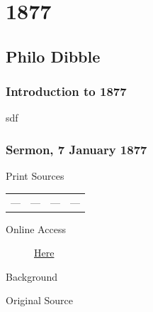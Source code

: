 \section{1877}

	\subsection{Philo Dibble}
		\label{EMS-1877-PD}

		\subsubsection{Introduction to 1877}
		
			sdf
			
		\subsubsection{Sermon, 7 January 1877}
			\label{EMS-1877-PD-7-JAN-1877}
			
			\begin{description}
					\item[Print Sources]
				\end{description}

					\begin{tabular}{p{0.5in}p{1in}p{0.5in}p{1in}}
					---	& ---		& --- 		& --- \\
					\end{tabular}
				
				\begin{description}
					\item[Online Access] \href{https://catalog.churchofjesuschrist.org/assets/d082597d-fef5-4c5e-8741-05eafb08df4a/0/0}{Here}
				\end{description}
				
				\begin{description}
					\item[Background]
				\end{description}
				
					\phantom{.}
				
				\begin{description}
					\item[Original Source]
				\end{description}
				
